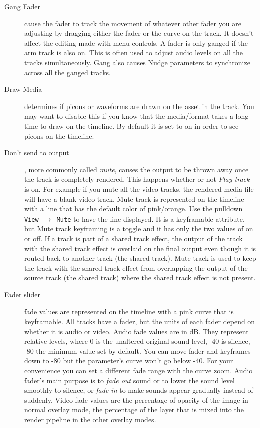 \begin{description}
    \item[Gang Fader] cause the fader to track the movement of whatever other fader you are adjusting by dragging either the fader or the curve on the track.  It doesn't affect the editing made with menu controls.  A fader is only ganged if the arm track is also on.  This is often used to adjust audio levels on all the tracks simultaneously.  Gang also causes Nudge parameters to synchronize across all the ganged tracks.
    \item[Draw Media] determines if picons or waveforms are drawn on the asset in the track.  You may want to disable this if you know that the media/format takes a long time to draw on the timeline.  By default it is set to on in order to see picons on the timeline.
    \item[Don’t send to output] , more commonly called \textit{mute}, causes the output to be thrown away once the track is completely rendered. This happens whether or not \textit{Play track} is on.  For example if you mute all the video tracks, the rendered media file will have a blank video track.  Mute track is represented on the timeline with a line that has the default color of pink/orange.  Use the pulldown \texttt{View $\rightarrow$ Mute} to have the line displayed.  It is a keyframable attribute, but Mute track keyframing is a toggle and it has only the two values of on or off. If a track is part of a shared track effect, the output of the track with the shared track effect is overlaid on the final output even though it is routed back to another track (the shared track).  Mute track is used to keep the track with the shared track effect from overlapping the output of the source track (the shared track) where the shared track effect is not present.
    \item[Fader slider] fade values are represented on the timeline with a pink curve that is keyframable.  All tracks have a fader, but the units of each fader depend on whether it is audio or video.  Audio fade values are in dB. They represent relative levels, where 0 is the unaltered original sound level, -40 is silence, -80 the minimum value set by default.  You can move fader and keyframes down to -80 but the parameter's curve won't go below -40.  For your convenience you can set a different fade range with the curve zoom.  Audio fader’s main purpose is to \textit{fade out} sound or to lower the sound level smoothly to silence, or \textit{fade in} to make sounds appear gradually instead of suddenly.  Video fade values are the percentage of opacity of the image in normal overlay mode, the percentage of the layer that is mixed into the render pipeline in the other overlay modes.

\end{description}
